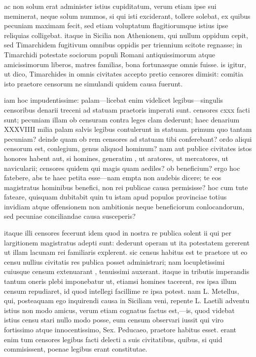  ac non solum erat administer istius cupiditatum, verum etiam ipse sui meminerat, neque solum nummos, si qui isti exciderant, tollere solebat, ex quibus pecuniam maximam fecit, sed etiam voluptatum flagitiorumque istius ipse reliquias colligebat. itaque in Sicilia non Athenionem, qui nullum oppidum cepit, sed Timarchidem fugitivum omnibus oppidis per triennium scitote regnasse; in Timarchidi potestate sociorum populi Romani antiquissimorum atque amicissimorum liberos, matres familias, bona fortunasque omnis fuisse. is igitur, ut dico, Timarchides in omnis civitates accepto pretio censores dimisit: comitia isto praetore censorum ne simulandi quidem causa fuerunt.

 iam hoc impudentissime: palam—licebat enim videlicet legibus—singulis censoribus denarii treceni ad statuam praetoris imperati sunt. censores cxxx facti sunt; pecuniam illam ob censuram contra leges clam dederunt; haec denarium XXXVIIII milia palam salvis legibus contulerunt in statuam. primum quo tantam pecuniam? deinde quam ob rem censores ad statuam tibi conferebant? ordo aliqui censorum est, conlegium, genus aliquod hominum? nam aut publice civitates istos honores habent aut, si homines, generatim , ut aratores, ut mercatores, ut navicularii; censores quidem qui magis quam aediles? ob beneficium? ergo hoc fatebere, abs te haec petita esse—nam empta non audebis dicere; te eos magistratus hominibus benefici, non rei publicae causa permisisse? hoc cum tute fateare, quisquam dubitabit quin tu istam apud populos provinciae totius invidiam atque offensionem non ambitionis neque beneficiorum conlocandorum, sed pecuniae conciliandae causa susceperis?

 itaque illi censores fecerunt idem quod in nostra re publica solent ii qui per largitionem magistratus adepti sunt: dederunt operam ut ita potestatem gererent ut illam lacunam rei familiaris explerent. sic census habitus est te praetore ut eo censu nullius civitatis res publica posset administrari; nam locupletissimi cuiusque censum extenuarant , tenuissimi auxerant. itaque in tributis imperandis tantum oneris plebi imponebatur ut, etiamsi homines tacerent, res ipsa illum censum repudiaret, id quod intellegi facillime re ipsa potest. nam L. Metellus, qui, posteaquam ego inquirendi causa in Siciliam veni, repente L. Laetili adventu istius non modo amicus, verum etiam cognatus factus est,—is, quod videbat istius censu stari nullo modo posse, eum censum observari iussit qui viro fortissimo atque innocentissimo, Sex. Peducaeo, praetore habitus esset. erant enim tum censores legibus facti delecti a suis civitatibus, quibus, si quid commisissent, poenae legibus erant constitutae.


